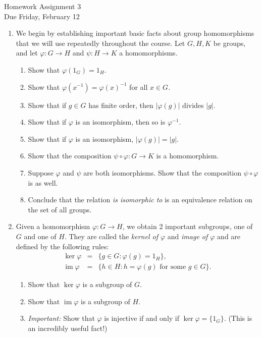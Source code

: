 \documentclass[11pt]{article}
\newcommand{\im}{\operatorname{im}}
\begin{document}
\begin{center}
\Large {Homework Assignment 3}\\
\small {Due Friday, February 12}
\end{center}
\begin{enumerate}
  \item We begin by establishing important basic facts about group homomorphisms that we will use repeatedly throughout the course.  Let $G,H,K$ be groups, and let $\varphi:G\to H$ and $\psi:H\to K$ a homomorphisms.
  \begin{enumerate}
    \item Show that $\varphi(1_G) = 1_H$.
    \item Show that $\varphi(x^{-1}) = \varphi(x)^{-1}$ for all $x\in G$.
    \item Show that if $g\in G$ has finite order, then $|\varphi(g)|$ divides $|g|$.
    \item Show that if $\varphi$ is an isomorphism, then so is $\varphi^{-1}$.
    \item Show that if $\varphi$ is an isomorphism, $|\varphi(g)| = |g|$.
    \item Show that the composition $\psi\circ \varphi:G\to K$ is a homomorphism.
    \item Suppose $\varphi$ and $\psi$ are both isomorphisms.  Show that the composition $\psi\circ\varphi$ is as well.
    \item Conclude that the relation \textit{is isomorphic to} is an equivalence relation on the set of all groups.
  \end{enumerate}
  \item Given a homomorphism $\varphi:G\to H$, we obtain 2 important subgroups, one of $G$ and one of $H$.  They are called the \textit{kernel of $\varphi$} and \textit{image of $\varphi$} and are defined by the following rules:
  \begin{eqnarray*}
    \ker\varphi &=& \{g\in G:\varphi(g) = 1_H\},\\
    \operatorname{im}\varphi &=& \{h\in H:h =\varphi(g)\text{ for some }g\in G\}.
  \end{eqnarray*}
  \begin{enumerate}
    \item Show that $\ker\varphi$ is a subgroup of $G$.
    \item Show that $\im\varphi$ is a subgroup of $H$.
    \item{\textit{Important:} Show that $\varphi$ is injective if and only if $\ker\varphi = \{1_G\}$.  (This is an incredibly useful fact!)}

\end{enumerate}
\end{enumerate}
\end{document}

